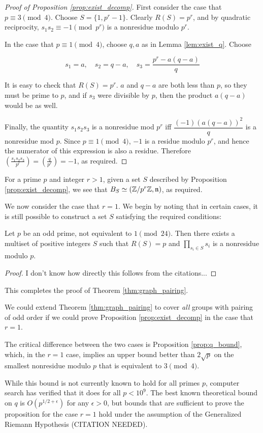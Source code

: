 \documentclass{amsart}
\begin{document}
\begin{proof}[Proof of Proposition \ref{prop:exist_decomp}]
  First consider the case that $p \equiv 3 \pmod 4$. Choose $S = \{1,
  p^r-1\}$. Clearly $R(S) = p^r$, and by quadratic reciprocity,
  $s_1s_2 \equiv -1 \pmod {p^r}$ is a nonresidue modulo $p^r$.

  In the case that $p \equiv 1 \pmod 4$, choose $q,a$ as in
  Lemma \ref{lem:exist_q}. Choose

  \[s_1 = a, \quad s_2 =  q-a, \quad s_3 = \frac{p^r - a(q-a)}{q}\]

  It is easy to check that $R(S) = p^r$. $a$ and $q-a$ are both less
  than $p$, so they must be prime to $p$, and if $s_3$ were divisible
  by $p$, then the product $a(q-a)$ would be as well.

  Finally, the quantity $s_1s_2s_3$ is a nonresidue mod $p^r$ iff
  $\dfrac{(-1)(a(q-a))^2}{q}$ is a nonresidue mod $p$. Since $p \equiv
  1 \pmod 4$, $-1$ is a residue modulo $p^r$, and hence the numerator
  of this expression is also a residue. Therefore $\left(
    \frac{s_1s_2s_3}{p^r} \right) = \left( \frac{q}{p^r} \right) =
  -1$, as required.
\end{proof}

For a prime $p$ and integer $r > 1$, given a set $S$ described by
Proposition \ref{prop:exist_decomp}, we see that $B_S \simeq (\mathbb{Z}/p^r\mathbb{Z},
\mathfrak{n})$, as required.

We now consider the case that $r=1$. We begin by noting that in
certain cases, it is still possible to construct a set $S$
satisfying the required conditions:
\begin{prop}
  Let $p$ be an odd prime, not equivalent to $1 \pmod {24}$. Then
  there exists a multiset of positive integers $S$ such that $R(S) =
  p$ and $\prod_{s_i \in S}s_i$ is a nonresidue modulo $p$.
\end{prop}
\begin{proof}
  I don't know how directly this follows from the citations...
\end{proof}

This completes the proof of Theorem \ref{thm:graph_pairing}.

\begin{remark} We could extend Theorem \ref{thm:graph_pairing} to
  cover \emph{all} groups with pairing of odd order if we could prove
  Proposition \ref{prop:exist_decomp} in the case that $r=1$.
  
  The critical difference between the two cases is Proposition
  \ref{prop:q_bound}, which, in the $r=1$ case, implies an upper bound
  better than $2\sqrt{p}$ on the smallest nonresidue modulo $p$ that
  is equivalent to $3 \pmod 4$.

  While this bound is not currently known to hold for all primes $p$,
  computer search has verified that it does for all $p < 10^9$. The
  best known theoretical bound on $q$ is $O(p^{1/2 + \epsilon})$ for
  any $\epsilon > 0$, but bounds that are sufficient to prove the
  proposition for the case $r=1$ hold under the assumption of the
  Generalized Riemann Hypothesis (CITATION NEEDED).
\end{remark}
\end{document}
